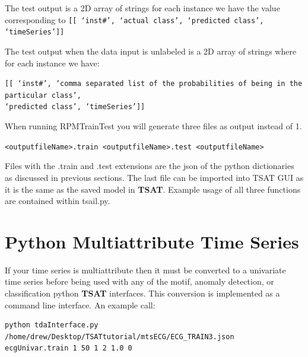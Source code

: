 \documentclass[titlepage, letterpaper, 12pt]{article}
\def\bsq#1{%
	\lq{#1}\rq}
\newcommand\TSAT{\textbf{TSAT}}
\begin{document}
The test output is a 2D array of strings for each instance we have the value corresponding to 
\texttt{[[\bsq{inst\#}, \bsq{actual class}, \bsq{predicted class}, \bsq{timeSeries}]]}

The test output when the data input is unlabeled is a 2D array of strings where for each instance we have:

\texttt{[[\bsq{inst\#}, \bsq{comma separated list of the probabilities of being in the particular class},\\\bsq{predicted class}, \bsq{timeSeries}]]}

When running RPMTrainTest you will generate three files as output instead of 1.

\texttt{<outputfileName>.train
<outputfileName>.test
<outputfileName>}

Files with the .train and .test extensions are the json of the python dictionaries as discussed in previous sections.  The last file can be imported into TSAT GUI as it is the same as the saved model in {\TSAT}. Example usage of all three functions are contained within tsail.py.


\section{Python Multiattribute Time Series}
If your time series is multiattribute then it must be converted to a univariate time series before being used with any of the motif, anomaly detection, or classification python {\TSAT} interfaces.  This conversion is implemented as a command line interface.  An example call:

\begin{verbatim}
python tdaInterface.py /home/drew/Desktop/TSATtutorial/mtsECG/ECG_TRAIN3.json
ecgUnivar.train 1 50 1 2 1.0 0
\end{verbatim}
\end{document}
